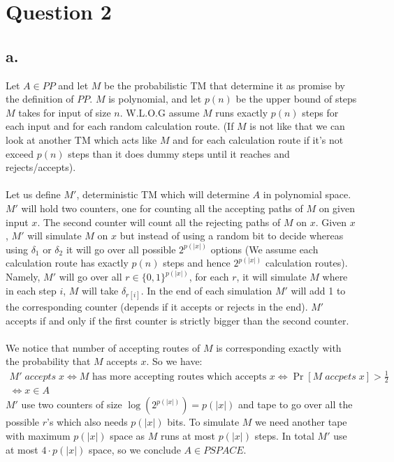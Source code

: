 \documentclass[11pt]{article}
\theoremstyle{plain}
\theoremstyle{nonumberplainnobrackets}
\begin{document}
\section*{Question 2}
\subsection*{a.} Let $A\in PP$ and let $M$ be the probabilistic TM that determine it as promise by the definition of $PP$. $M$ is polynomial, and let $p(n)$ be the upper bound of steps $M$ takes for input of size $n$. W.L.O.G assume $M$ runs exactly $p(n)$ steps for each input and for each random calculation route. (If $M$ is not like that we can look at another TM which acts like $M$ and for each calculation route if it's not exceed $p(n)$ steps than it does dummy steps until it reaches and rejects/accepts).\\
\\
Let us define $M'$, deterministic TM which will determine $A$ in polynomial space. $M'$ will hold two counters, one for counting all the accepting paths of $M$ on given input $x$. The second counter will count all the rejecting paths of $M$ on $x$. Given $x$, $M'$ will simulate $M$ on $x$ but instead of using a random bit to decide whereas using $\delta_1$ or $\delta_2$ it will go over all possible $2^{p(|x|)}$ options (We assume each calculation route has exactly $p(n)$ steps and hence $2^{p(|x|)}$ calculation routes). Namely, $M'$ will go over all $r\in \{0,1\}^{p(|x|)}$, for each $r$, it will simulate $M$ where in each step $i$, $M$ will take $\delta_{r[i]}$. In the end of each simulation $M'$ will add 1 to the corresponding counter (depends if it accepts or rejects in the end). $M'$ accepts if and only if the first counter is strictly bigger than the second counter.\\
\\
We notice that number of accepting routes of $M$ is corresponding exactly with the probability that $M$ accepts $x$. So we have:
\begin{align*}
M'\;accepts\; x\iff M \text{ has more accepting routes which accepts }x\iff \Pr[M\;accpets \;x]>\frac{1}{2}\\\iff x\in A 
\end{align*} 
$M'$ use two counters of size $\log (2^{p(|x|)})=p(|x|)$ and tape to go over all the possible $r$'s which also needs $p(|x|)$ bits. To simulate $M$ we need another tape with maximum $p(|x|)$ space as $M$ runs at most $p(|x|)$ steps. In total $M'$ use at most $4\cdot p(|x|)$ space, so we conclude $A\in PSPACE$.
\end{document}
